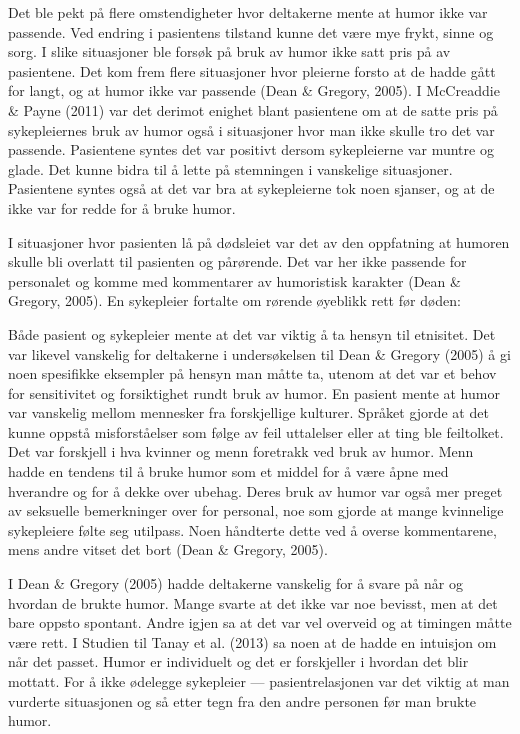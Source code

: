 Det ble pekt på flere omstendigheter hvor deltakerne mente at humor ikke var
passende. Ved endring i pasientens tilstand kunne det være mye frykt, sinne og
sorg. I slike situasjoner ble forsøk på bruk av humor ikke satt pris på av
pasientene. Det kom frem flere situasjoner hvor pleierne forsto at de hadde
gått for langt, og at humor ikke var passende (Dean \&{} Gregory, 2005). I
McCreaddie \&{} Payne (2011) var det derimot enighet blant pasientene om at de
satte pris på sykepleiernes bruk av humor også i situasjoner hvor man ikke
skulle tro det var passende. Pasientene syntes det var positivt dersom
sykepleierne var muntre og glade. Det kunne bidra til å lette på stemningen i
vanskelige situasjoner. Pasientene syntes også at det var bra at sykepleierne
tok noen sjanser, og at de ikke var for redde for å bruke humor.

I situasjoner hvor pasienten lå på dødsleiet var det av den oppfatning at
humoren skulle bli overlatt til pasienten og pårørende. Det var her ikke
passende for personalet og komme med kommentarer av humoristisk karakter (Dean
\&{} Gregory, 2005). En sykepleier fortalte om rørende øyeblikk rett før døden:

Både pasient og sykepleier mente at det var viktig å ta hensyn til etnisitet.
Det var likevel vanskelig for deltakerne i undersøkelsen til Dean \&{} Gregory
(2005) å gi noen spesifikke eksempler på hensyn man måtte ta, utenom at det var
et behov for sensitivitet og forsiktighet rundt bruk av humor. En pasient mente
at humor var vanskelig mellom mennesker fra forskjellige kulturer. Språket
gjorde at det kunne oppstå misforståelser som følge av feil uttalelser eller at
ting ble feiltolket.  Det var forskjell i hva kvinner og menn foretrakk ved
bruk av humor. Menn hadde en tendens til å bruke humor som et middel for å være
åpne med hverandre og for å dekke over ubehag. Deres bruk av humor var også mer
preget av seksuelle bemerkninger over for personal, noe som gjorde at mange
kvinnelige sykepleiere følte seg utilpass. Noen håndterte dette ved å overse
kommentarene, mens andre vitset det bort (Dean \&{} Gregory, 2005).

I Dean \&{} Gregory (2005) hadde deltakerne vanskelig for å svare på når og
hvordan de brukte humor. Mange svarte at det ikke var noe bevisst, men at det
bare oppsto spontant. Andre igjen sa at det var vel overveid og at timingen
måtte være rett. I Studien til Tanay et al. (2013) sa noen at de hadde en
intuisjon om når det passet. Humor er individuelt og det er forskjeller i
hvordan det blir mottatt. For å ikke ødelegge sykepleier --- pasientrelasjonen
var det viktig at man vurderte situasjonen og så etter tegn fra den andre
personen før man brukte humor.

